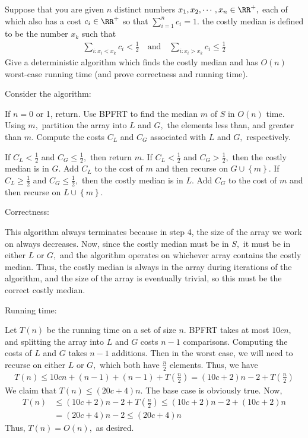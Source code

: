 \documentclass{article}
\begin{document}
Suppose that you are given $n$ distinct numbers $x_1, x_2, \cdots, x_n\in\RR^+,$ each of which also has a cost $c_i\in\RR^+$ so that $\sum_{i=1}^{n} c_i=1.$ the costly median is defined to be the number $x_k$ such that
\begin{align*}
	\sum_{i: x_i<x_k}^{} c_i<\frac{1}{2} \quad\text{and}\quad \sum_{i:x_i>x_k}^{}c_i\le\frac{1}{2}
\end{align*}
Give a deterministic algorithm which finds the costly median and has $O(n)$ worst-case running time (and prove correctness and running time).
\begin{soln}
	Consider the algorithm:
	\begin{enumerate}
			\ii If $n=0$ or 1, return.
			\ii Use BPFRT to find the median $m$ of $S$ in $O(n)$ time.
			\ii Using $m,$ partition the array into $L$ and $G,$ the elements less than, and greater than $m.$
			\ii Compute the costs $C_L$ and $C_G$ associated with $L$ and $G,$ respectively.
			\begin{enumerate}[(i)]
					\ii If $C_L<\frac{1}{2}$ and $C_G\le \frac{1}{2},$ then return $m.$
					\ii If $C_L<\frac{1}{2}$ and $C_G>\frac{1}{2},$ then the costly median is in $G.$ Add $C_L$ to the cost of $m$ and then recurse on $G\cup\left\{ m \right\}.$
					\ii If $C_L\ge \frac{1}{2}$ and $C_G\le \frac{1}{2},$ then the costly median is in $L.$ Add $C_G$ to the cost of $m$ and then recurse on $L\cup \left\{ m \right\}.$
			\end{enumerate}
	\end{enumerate}

	Correctness:
	\begin{subproof}
		This algorithm always terminates because in step 4, the size of the array we work on always decreases. Now, since the costly median must be in $S,$ it must be in either $L$ or $G,$ and the algorithm operates on whichever array contains the costly median. Thus, the costly median is always in the array during iterations of the algorithm, and the size of the array is eventually trivial, so this must be the correct costly median.
	\end{subproof}

	Running time:
	\begin{subproof}
		Let $T(n)$ be the running time on a set of size $n.$ BPFRT takes at most $10cn,$ and splitting the array into $L$ and $G$ costs $n-1$ comparisons. Computing the costs of $L$ and $G$ takes $n-1$ additions. Then in the worst case, we will need to recurse on either $L$ or $G,$ which both have $\frac{n}{2}$ elements. Thus, we have
		\begin{align*}
			T(n) \le 10cn + (n-1) + (n-1) + T\left( \frac{n}{2} \right) = (10c+2)n-2 + T\left( \frac{n}{2} \right)
		\end{align*}
		We claim that $T(n)\le (20c+4)n.$ The base case is obviously true. Now,
		\begin{align*}
			T(n)&\le (10c+2)n-2+T\left( \frac{n}{2} \right) \le (10c+2)n-2 + (10c+2)n \\
			&= (20c+4)n-2\le (20c+4)n
		\end{align*}
		Thus, $T(n)=O(n),$ as desired.
	\end{subproof}
\end{soln}
\end{document}
